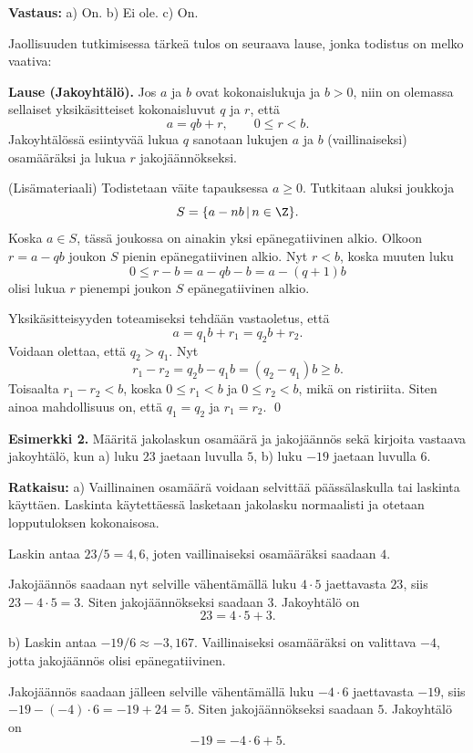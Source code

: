 {\bf Vastaus:} a) On.  b) Ei ole. c) On.


Jaollisuuden tutkimisessa tärkeä tulos on seuraava lause, jonka todistus on melko vaativa:

{\bf Lause (Jakoyhtälö).}
Jos $a$ ja $b$ ovat kokonaislukuja ja $b > 0$, niin on olemassa sellaiset yksikäsitteiset kokonaisluvut $q$ ja $r$, että
\[
a = qb + r,\qquad 0\le r<b.
\]
Jakoyhtälössä esiintyvää lukua $q$ sanotaan lukujen $a$ ja $b$ (vaillinaiseksi) osamääräksi ja lukua $r$  jakojäännökseksi.


\proof (Lisämateriaali)
Todistetaan väite tapauksessa $a\ge 0$. Tutkitaan aluksi joukkoja
\[
S = \{ a-nb\,|\, n\in \Z\}.
\]
Koska $a\in S$, tässä joukossa on ainakin yksi epänegatiivinen alkio. Olkoon $r=a-qb$ joukon $S$ pienin epänegatiivinen alkio. Nyt $r < b$, koska muuten luku 
\[
0\le r - b = a - qb - b = a - (q+1)b 
\]
olisi lukua $r$ pienempi joukon $S$ epänegatiivinen alkio.

Yksikäsitteisyyden toteamiseksi tehdään vastaoletus, että
\[
a= q_1b+r_1 = q_2b+r_2.
\]
Voidaan olettaa, että $q_2>q_1$. Nyt
\[
r_1 - r_2 = q_2b - q_1b = (q_2-q_1)b \ge b.
\]
Toisaalta $r_1-r_2<b$, koska $0\le r_1 < b$ ja $0\le r_2 < b$, mikä on ristiriita. Siten ainoa mahdollisuus on, että $q_1=q_2$ ja $r_1=r_2$. 
\qed


{\bf Esimerkki 2.}
Määritä jakolaskun osamäärä ja jakojäännös sekä kirjoita vastaava jakoyhtälö, kun
a) luku $23$ jaetaan luvulla $5$,  b)  luku $-19$ jaetaan luvulla $6$.

{\bf Ratkaisu:}
a) Vaillinainen osamäärä voidaan selvittää päässälaskulla tai laskinta käyttäen. Laskinta käytettäessä lasketaan jakolasku normaalisti ja otetaan lopputuloksen kokonaisosa.

Laskin antaa $23/5 = 4,6$, joten vaillinaiseksi osamääräksi saadaan $4$.

Jakojäännös saadaan nyt selville vähentämällä luku $4\cdot 5$ jaettavasta $23$, siis $23-4\cdot 5=3$. Siten jakojäännökseksi saadaan $3$. 
Jakoyhtälö on
\[
23 = 4\cdot 5 + 3.
\]

b) Laskin antaa $-19/6 \approx -3,167$. Vaillinaiseksi osamääräksi on valittava $-4$, jotta jakojäännös olisi epänegatiivinen.

Jakojäännös saadaan jälleen selville vähentämällä luku $-4\cdot 6$ jaettavasta $-19$, siis $-19-(-4)\cdot 6=-19+24=5$. Siten jakojäännökseksi saadaan $5$. 
Jakoyhtälö on
\[
-19 = -4\cdot 6 +5.
\]

